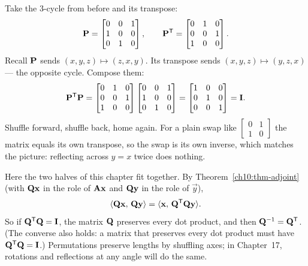 \begin{example}\label{ch10:ex-cycle-inverse}
Take the $3$-cycle from before and its transpose:
\[
  \mathbf{P}=\begin{bmatrix} 0 & 0 & 1 \\ 1 & 0 & 0 \\ 0 & 1 & 0 \end{bmatrix},
  \qquad
  \mathbf{P}^{\mathsf{T}}=\begin{bmatrix} 0 & 1 & 0 \\ 0 & 0 & 1 \\ 1 & 0 & 0 \end{bmatrix}.
\]
Recall $\mathbf{P}$ sends $(x,y,z)\mapsto(z,x,y)$. Its transpose sends $(x,y,z)\mapsto(y,z,x)$ --- the
opposite cycle. Compose them:
\[
  \mathbf{P}^{\mathsf{T}}\mathbf{P}
  = \begin{bmatrix} 0 & 1 & 0 \\ 0 & 0 & 1 \\ 1 & 0 & 0 \end{bmatrix}
    \begin{bmatrix} 0 & 0 & 1 \\ 1 & 0 & 0 \\ 0 & 1 & 0 \end{bmatrix}
  = \begin{bmatrix} 1 & 0 & 0 \\ 0 & 1 & 0 \\ 0 & 0 & 1 \end{bmatrix} = \mathbf{I}.
\]
Shuffle forward, shuffle back, home again. For a plain swap like
$\left[\begin{smallmatrix}0&1\\1&0\end{smallmatrix}\right]$ the matrix equals its own transpose, so
the swap is its own inverse, which matches the picture: reflecting across $y=x$ twice does nothing.
\end{example}

\begin{aestheticbox}
Here the two halves of this chapter fit together. By Theorem~\ref{ch10:thm-adjoint} (with
$\mathbf{Q}\mathbf{x}$ in the role of $\mathbf{A}\mathbf{x}$ and $\mathbf{Q}\mathbf{y}$ in the role of $\vec{y}$),
\[
  \langle \mathbf{Q}\mathbf{x},\, \mathbf{Q}\mathbf{y} \rangle = \langle \mathbf{x},\, \mathbf{Q}^{\mathsf{T}}\mathbf{Q}\mathbf{y} \rangle.
\]
So if $\mathbf{Q}^{\mathsf{T}}\mathbf{Q}=\mathbf{I}$, the matrix $\mathbf{Q}$ preserves every dot product, and then
$\mathbf{Q}^{-1}=\mathbf{Q}^{\mathsf{T}}$. (The converse also holds: a matrix that preserves every dot product must
have $\mathbf{Q}^{\mathsf{T}}\mathbf{Q}=\mathbf{I}$.) Permutations preserve lengths by shuffling axes; in Chapter~17,
rotations and reflections at any angle will do the same.
\end{aestheticbox}

